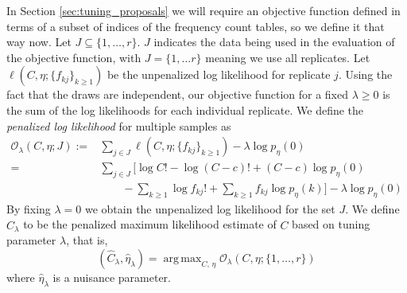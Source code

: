 \documentclass[12pt]{article}
\DeclareMathOperator*{\argmax}{arg\,max}
\theoremstyle{break}
\theoremstyle{break}
\begin{document}

In Section \ref{sec:tuning_proposals} we will require an objective function defined in terms of a subset of indices of the frequency count tables, so we define it that way now.  Let $J \subseteq \{1, \dots, r\}$.  $J$ indicates the data being used in the evaluation of the objective function, with $J = \{1, \dots r\}$ meaning we use all replicates.  Let $\ell \left(C, \eta; \{f_{kj}\}_{k \geq 1} \right)$ be the unpenalized log likelihood for replicate $j$.
Using the fact that the draws are independent, our objective function for a fixed $\lambda \geq 0$ is the sum of the log likelihoods for each individual replicate.
We define the \textit{penalized log likelihood} for multiple samples as
\begin{align}
\mathcal{O}_{\lambda}(C, \eta; J) :=& \sum_{j \in J} \ell \left(C, \eta; \{f_{kj}\}_{k \geq 1} \right) - \lambda\log p_{\eta}(0) \\
 =& \sum_{j \in J} \biggl[ \log C! - \log (C-c)! + (C-c) \log p_\eta(0)  \nonumber \\
 & \qquad  - \sum_{k \geq 1} \log{} f_{kj}! + \sum_{k \geq 1} f_{kj} \log p_\eta(k) \biggr] - \lambda \log p_\eta(0)    \label{eq:objective}
\end{align}
By fixing $\lambda = 0$ we obtain the unpenalized log likelihood for the set $J$.  We define $\widehat{C}_{\lambda}$ to be the penalized maximum likelihood estimate of $C$ based on tuning parameter $\lambda$, that is,
\begin{equation}
\left(\widehat{C}_{\lambda},  \widehat{\eta}_{\lambda} \right) = \argmax_{C, \, \eta}  \mathcal{O}_{\lambda} \left(C, \eta ; \{1, \dots , r\} \right) \label{eq:ccc_hat_lambda}
\end{equation}
where $\widehat{\eta}_{\lambda}$ is a nuisance parameter.
\end{document}
